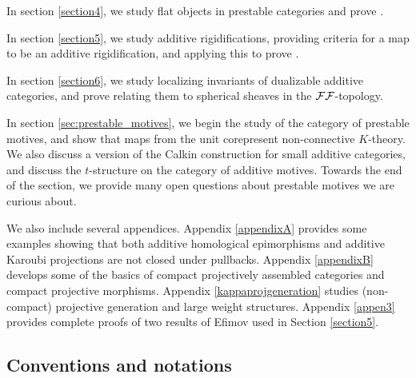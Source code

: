 \documentclass[a4paper,10pt, oneside]{amsart}
\begin{document}
In section \ref{section4}, we study flat objects in prestable categories and prove .

In section \ref{section5}, we study additive rigidifications, providing criteria for a map to be an additive rigidification, and 
applying this to prove .

In section \ref{section6}, we study localizing invariants of dualizable additive categories, and prove  relating them to spherical sheaves in the $\mathcal{F}\mathcal{F}$-topology.

In section \ref{sec:prestable_motives}, we begin the study of the category of prestable motives, and show that maps from the unit corepresent non-connective $K$-theory. We also discuss a version of the Calkin construction 
for small additive categories, and discuss the $t$-structure on the category of additive motives. Towards the end of the section, we provide many open questions about prestable motives we are curious about.

We also include several appendices. Appendix \ref{appendixA} provides some examples showing that both
additive homological epimorphisms and additive Karoubi projections are not closed under pullbacks.
Appendix \ref{appendixB} develops some of the basics of compact projectively assembled categories and compact projective morphisms.
Appendix \ref{kappaprojgeneration} studies (non-compact) projective generation and large weight structures.
Appendix \ref{appen3} provides complete proofs of two results of Efimov used in Section \ref{section5}.
	\subsection*{Conventions and notations}
\end{document}
